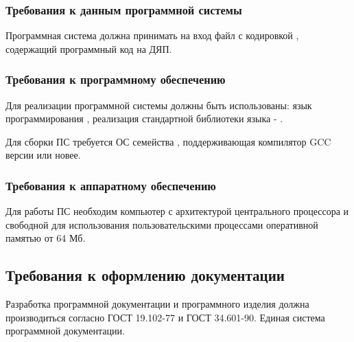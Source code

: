 \subsubsection{Требования к данным программной системы}
Программная система должна принимать на вход файл с кодировкой , содержащий программный код на ДЯП.

\subsubsection{Требования к программному обеспечению}
Для реализации программной системы должны быть использованы: язык программирования , реализация стандартной библиотеки языка - .

Для сборки ПС требуется ОС семейства , поддерживающая компилятор GCC версии  или новее.

\subsubsection{Требования к аппаратному обеспечению}
Для работы ПС необходим компьютер с архитектурой центрального процессора  и свободной для использования пользовательскими процессами оперативной памятью от 64 Мб.

\subsection{Требования к оформлению документации}

Разработка программной документации и программного изделия должна производиться согласно ГОСТ 19.102-77 и ГОСТ 34.601-90. Единая система программной документации.
